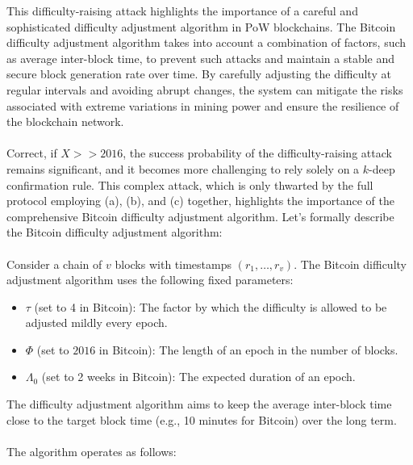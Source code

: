This difficulty-raising attack highlights the importance of a careful and sophisticated difficulty adjustment algorithm in PoW blockchains. The Bitcoin difficulty adjustment algorithm takes into account a combination of factors, such as average inter-block time, to prevent such attacks and maintain a stable and secure block generation rate over time. By carefully adjusting the difficulty at regular intervals and avoiding abrupt changes, the system can mitigate the risks associated with extreme variations in mining power and ensure the resilience of the blockchain network.\\\\
Correct, if $X >> 2016$, the success probability of the difficulty-raising attack remains significant, and it becomes more challenging to rely solely on a $k$-deep confirmation rule. This complex attack, which is only thwarted by the full protocol employing (a), (b), and (c) together, highlights the importance of the comprehensive Bitcoin difficulty adjustment algorithm. Let's formally describe the Bitcoin difficulty adjustment algorithm:\\\\
Consider a chain of $v$ blocks with timestamps $(r_1, \ldots, r_v)$. The Bitcoin difficulty adjustment algorithm uses the following fixed parameters:

\begin{itemize}
    \item $\tau$ (set to 4 in Bitcoin): The factor by which the difficulty is allowed to be adjusted mildly every epoch.
    \item $\Phi$ (set to $2016$ in Bitcoin): The length of an epoch in the number of blocks.
    \item $\Lambda_0$ (set to 2 weeks in Bitcoin): The expected duration of an epoch.
\end{itemize}

The difficulty adjustment algorithm aims to keep the average inter-block time close to the target block time (e.g., 10 minutes for Bitcoin) over the long term.\\\\
The algorithm operates as follows:

